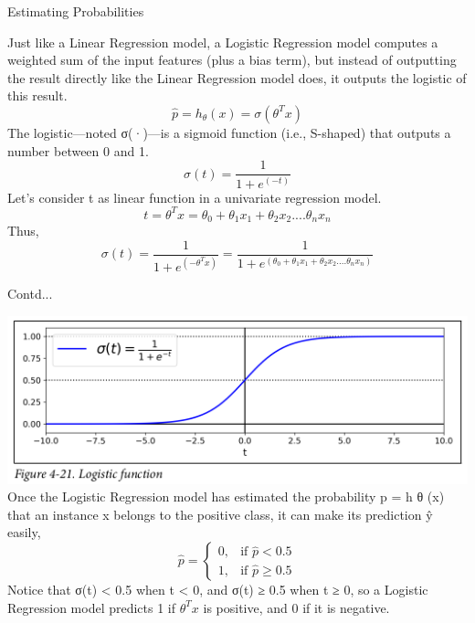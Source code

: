 \documentclass{beamer}
\begin{document}
\begin{frame}{Estimating Probabilities}
\begin{flushleft}
Just like a Linear Regression model, a Logistic Regression
model computes a weighted sum of the input features (plus a bias term), but instead of outputting the result directly like the Linear Regression model does, it outputs the logistic of this result.
\begin{equation*}
	\hat{p} = h_\theta(x) = \sigma(\theta^Tx)
\end{equation*}
The logistic—noted σ(·)—is a sigmoid function (i.e., S-shaped) that outputs a number between 0 and 1.
\begin{equation*}
	\sigma(t) = \frac{1}{1 + e^{(-t)}}
\end{equation*}
Let’s consider t as linear function in a univariate regression model.
\begin{equation*}
	t = \theta^Tx = \theta_0 + \theta_1x_1 + \theta_2x_2 ....\theta_nx_n
\end{equation*}
Thus, 
\begin{equation*}
	\sigma(t) = \frac{1}{1 + e^{(-\theta^Tx)}} = \frac{1}{1 + e^{(\theta_0 + \theta_1x_1 + \theta_2x_2 ....\theta_nx_n)}}
\end{equation*}
	\end{flushleft}
\end{frame}
\begin{frame}{Contd...}
\begin{flushleft}
\includegraphics[scale=0.62]{sigmoid}\\
	 Once the Logistic Regression model has estimated the probability p = h θ (x) that an instance x belongs to the positive class, it can make its prediction ŷ easily,
\begin{equation*}
	\hat{p} = 
	\begin{cases}
		0,& \text{if } \hat{p} < 0.5 \\
		1,& \text{if } \hat{p} \geq 0.5
	\end{cases}
\end{equation*}
Notice that σ(t) < 0.5 when t < 0, and σ(t) ≥ 0.5 when t ≥ 0, so a Logistic Regression model predicts 1 if $\theta^Tx$ is positive, and 0 if it is negative.
\end{flushleft}
\end{frame}
\end{document}
